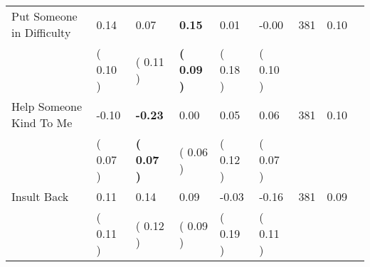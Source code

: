 \begin{tabular}{L{6.2cm} C{1.8cm} C{1.8cm} C{1.8cm} C{1.8cm} C{1.8cm} C{1.8cm} C{0.3cm} C{0.3cm}}
Put Someone in Difficulty &      0.14 &      0.07 & \textbf{     0.15} &      0.01 &     -0.00  & 381 &       0.10 \\ 
 & (     0.10 ) & (     0.11 ) & \textbf{(     0.09 )} & (     0.18 ) & (     0.10 )  & \\
Help Someone Kind To Me &     -0.10 & \textbf{    -0.23} &      0.00 &      0.05 &      0.06  & 381 &       0.10 \\ 
 & (     0.07 ) & \textbf{(     0.07 )} & (     0.06 ) & (     0.12 ) & (     0.07 )  & \\
Insult Back &      0.11 &      0.14 &      0.09 &     -0.03 &     -0.16  & 381 &       0.09 \\ 
 & (     0.11 ) & (     0.12 ) & (     0.09 ) & (     0.19 ) & (     0.11 )  & \\
\bottomrule
\end{tabular}
